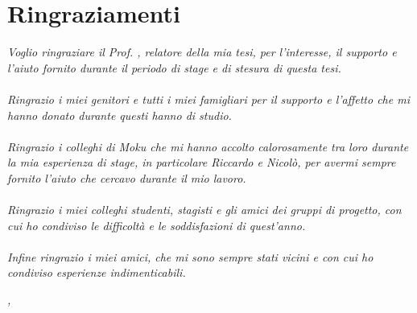 
\cleardoublepage
{}

\begingroup
\let\clearpage\relax
\let\cleardoublepage\relax
\let\cleardoublepage\relax

\chapter*{Ringraziamenti}
\textit{Voglio ringraziare il Prof. \myProf, relatore della mia tesi, per l'interesse, il supporto e l'aiuto fornito durante il periodo di stage e di stesura di questa tesi.} \\
\\
\textit{Ringrazio i miei genitori e tutti i miei famigliari per il supporto e l'affetto che mi hanno donato durante questi hanno di studio.} \\
\\
\textit{Ringrazio i colleghi di Moku che mi hanno accolto calorosamente tra loro durante la mia esperienza di stage, in particolare Riccardo e Nicolò, per avermi sempre fornito l'aiuto che cercavo durante il mio lavoro.} \\
\\
\textit{Ringrazio i miei colleghi studenti, stagisti e gli amici dei gruppi di progetto, con cui ho condiviso le difficoltà e le soddisfazioni di quest'anno.} \\
\\
\textit{Infine ringrazio i miei amici, che mi sono sempre stati vicini e con cui ho condiviso esperienze indimenticabili.} \\
\bigskip

\noindent\textit{\myLocation, \myTime}
\hfill \myName

\endgroup

